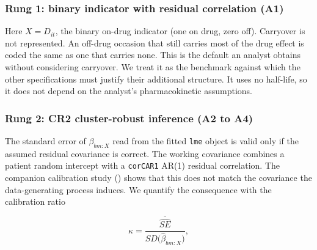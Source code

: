 \documentclass[
  11pt,
]{article}
\newcounter{none} %
\begin{document}
\subsubsection{Rung 1: binary indicator with residual correlation (A1)}\label{sec-g1}

Here \(X = D_{it}\), the binary on-drug indicator (one on drug, zero
off). Carryover is not represented. An off-drug occasion that still
carries most of the drug effect is coded the same as one that
carries none. This is the default an analyst obtains without
considering carryover. We treat it as the benchmark against which
the other specifications must justify their additional structure.
It uses no half-life, so it does not depend on the analyst's
pharmacokinetic assumptions.

\subsubsection{Rung 2: CR2 cluster-robust inference (A2 to A4)}\label{sec-cr2-method}

The standard error of \(\beta_{bm:X}\) read from the fitted \texttt{lme}
object is valid only if the assumed residual covariance is correct.
The working covariance combines a patient random intercept with a
\texttt{corCAR1} AR(1) residual correlation. The companion calibration
study () shows that this does not match
the covariance the data-generating process induces. We quantify the
consequence with the calibration ratio

\[\kappa = \frac{\overline{\widehat{SE}}}{SD\big(\hat\beta_{bm:X}\big)},\]
\end{document}
